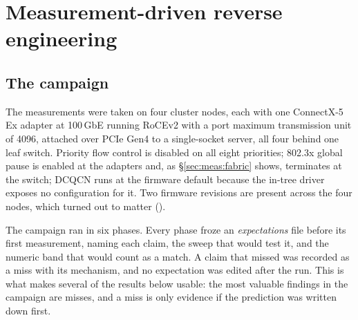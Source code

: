 \section{Measurement-driven reverse engineering}
\label{sec:measurement}

\subsection{The campaign}

The measurements were taken on four cluster nodes, each with one ConnectX-5 Ex
adapter at 100\,GbE running RoCEv2 with a port maximum transmission unit of
4096, attached over PCIe Gen4 to a single-socket server, all four behind one
leaf switch. Priority flow control is disabled on all eight priorities;
802.3x global pause is enabled at the adapters and, as \S\ref{sec:meas:fabric}
shows, terminates at the switch; DCQCN runs at the firmware default because the
in-tree driver exposes no configuration for it. Two firmware revisions are
present across the four nodes, which turned out to matter
().

The campaign ran in six phases. Every phase froze an \emph{expectations} file
before its first measurement, naming each claim, the sweep that would test it,
and the numeric band that would count as a match. A claim that missed was
recorded as a miss with its mechanism, and no expectation was edited after the
run. This is what makes several of the results below usable: the most valuable
findings in the campaign are misses, and a miss is only evidence if the
prediction was written down first.

